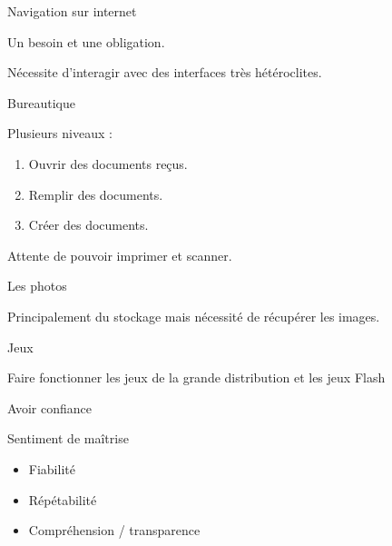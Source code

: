 \documentclass[xcolor=svgnames]{beamer}
\begin{document}
    \begin{frame}{Navigation sur internet}
    
        Un besoin et une obligation. \pause
        
        Nécessite d’interagir avec des interfaces très hétéroclites.
        
    \end{frame}
    
    
    \begin{frame}{Bureautique}
        
        Plusieurs niveaux :
        \begin{enumerate}
            \item Ouvrir des documents reçus.
            \item Remplir des documents.
            \item Créer des documents.
        \end{enumerate} \pause
        
        Attente de pouvoir imprimer et scanner.
        
    \end{frame}
    
    
    \begin{frame}{Les photos}
        
        Principalement du stockage \pause mais nécessité de récupérer les images.
        
    \end{frame}
    
    
    \begin{frame}{Jeux}
    
        Faire fonctionner les jeux de la grande distribution \pause
        et les jeux Flash
        
    \end{frame}
    
    
    \begin{frame}{Avoir confiance}
    
        Sentiment de maîtrise \pause
        
        \begin{itemize}
            \item Fiabilité
            \item Répétabilité
            \item Compréhension / transparence
        \end{itemize}
        
    \end{frame}
    
\end{document}
